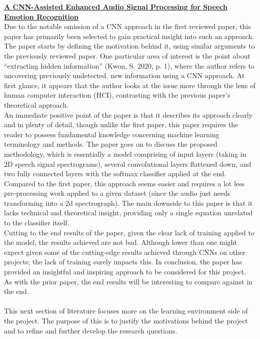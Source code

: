 \documentclass[12pt]{article}
\begin{document}
\noindent \href{https://www.mdpi.com/1424-8220/20/1/183/pdf}{\textbf{A CNN-Assisted Enhanced Audio Signal Processing for Speech Emotion Recognition}}
\\
Due to the notable omission of a CNN approach in the first reviewed paper, this paper has primarily been selected to gain practical insight into such an approach. The paper starts by defining the motivation behind it, using similar arguments to the previously reviewed paper. One particular area of interest is the point about ``extracting hidden information'' (Kwon, S. 2020, p. 1), where the author refers to uncovering previously undetected, new information using a CNN approach. At first glance, it appears that the author looks at the issue more through the lens of human computer interaction (HCI), contrasting with the previous paper's theoretical approach.
\\

\noindent An immediate positive point of the paper is that it describes its approach clearly and in plenty of detail, though unlike the first paper, this paper requires the reader to possess fundamental knowledge concerning machine learning terminology and methods. The paper goes on to discuss the proposed methodology, which is essentially a model comprising of input layers (taking in 2D speech signal spectrograms), several convolutional layers flattened down, and two fully connected layers with the softmax classifier applied at the end. Compared to the first paper, this approach seems easier and requires a lot less pre-processing work applied to a given dataset (since the audio just needs transforming into a 2d spectrograph). The main downside to this paper is that it lacks technical and theoretical insight, providing only a single equation unrelated to the classifier itself.
\\

\noindent Cutting to the end results of the paper, given the clear lack of training applied to the model, the results achieved are not bad. Although lower than one might expect given some of the cutting-edge results achieved through CNNs on other projects; the lack of training surely impacts this. In conclusion, the paper has provided an insightful and inspiring approach to be considered for this project. As with the prior paper, the end results will be interesting to compare against in the end. 
\\
\pagebreak
\\

\noindent This next section of literature focuses more on the learning environment side of the project. The purpose of this is to justify the motivations behind the project and to refine and further develop the research questions.
\\
\end{document}
